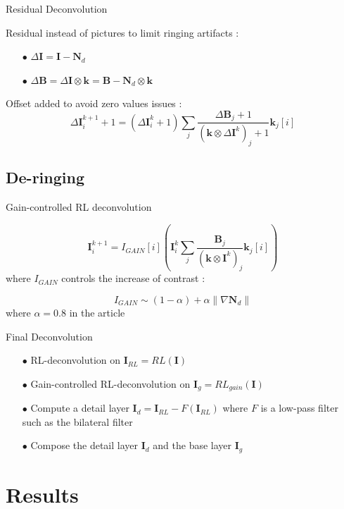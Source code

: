 \documentclass[french]{beamer}
\newcommand{\I}{\textbf{I}}
\newcommand{\B}{\textbf{B}}
\newcommand{\Nd}{\textbf{N$_d$}}
\newcommand{\kernel}{\textbf{k}}
\theoremstyle{plain}
\theoremstyle{remark}
\begin{document}
\begin{frame}{Residual Deconvolution}

Residual instead of pictures to limit ringing artifacts :
\begin{itemize}
	\item[$\bullet$] $\Delta \I = \I - \Nd$
	\item[$\bullet$] $\Delta \B = \Delta \I \otimes \kernel = \B - \Nd \otimes \kernel$
\end{itemize}
\pause
Offset added to avoid zero values issues :
\[
	\Delta \I^{k+1}_i + 1= (\Delta\I^k_i+1) \sum_{j}\frac{\Delta\B_j + 1}{(\kernel \otimes \Delta\I^k)_j + 1} \kernel_j[i]
\]

\end{frame}

\subsection{De-ringing}	

\begin{frame}{Gain-controlled RL deconvolution}

\[
	\I^{k+1} _i= I_{GAIN}[i](\I^k_i \sum_{j}\frac{\B_j}{(\kernel \otimes \I^k)_j} \kernel_j[i])
\]
\pause
where $I_{GAIN}$ controls the increase of contrast :

\[
	I_{GAIN} \sim (1 - \alpha) + \alpha \| \nabla \Nd \|
\]
where $\alpha = 0.8$ in the article

\end{frame}

\begin{frame}{Final Deconvolution}

\begin{itemize}
	\item[$\bullet$] RL-deconvolution on $\I_{RL} = RL(\I)$
	\pause
	\item[$\bullet$] Gain-controlled RL-deconvolution on $\I_{g} = RL_{gain}(\I)$
	\pause
	\item[$\bullet$] Compute a detail layer $\I_d = \I_{RL} - F(\I_{RL})$ where $F$ is a low-pass filter such as the bilateral filter
	\pause
	\item[$\bullet$] Compose the detail layer $\I_d$ and the base layer $\I_g$
\end{itemize}

\end{frame}

\section{Results}
\end{document}
